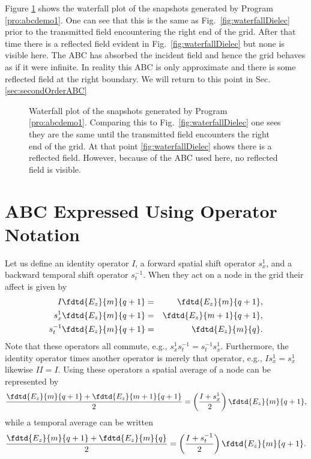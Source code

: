 Figure \ref{fig:dielectricABC} shows the waterfall plot of the
snapshots generated by Program \ref{pro:abcdemo1}.  One can see that
this is the same as Fig.\ \ref{fig:waterfallDielec} prior to the
transmitted field encountering the right end of the grid.  After that
time there is a reflected field evident in Fig.\
\ref{fig:waterfallDielec} but none is visible here.  The ABC has
absorbed the incident field and hence the grid behaves as if it were
infinite.  In reality this ABC is only approximate and there is some
reflected field at the right boundary.  We will return to this point
in Sec. \ref{sec:secondOrderABC}

\begin{figure}
  \begin{center}
  \end{center}
  \caption{Waterfall plot of the snapshots generated by Program
  \ref{pro:abcdemo1}.  Comparing this to Fig.\
  \ref{fig:waterfallDielec} one sees they are the same until the transmitted
  field encounters the right end of the grid.  At that point
  \ref{fig:waterfallDielec} shows there is a reflected field.  However,
  because of the ABC used here, no reflected field is visible.}
  \label{fig:dielectricABC}
\end{figure}

\section{ABC Expressed Using Operator Notation \label{sec:abcOperator}}

Let us define an identity operator $I$, a forward spatial shift
operator $s_x^{1}$, and a backward temporal shift operator $s_t^{-1}$.
When they act on a node in the grid their affect is given by
\begin{eqnarray}
  I\fdtd{E_z}{m}{q+1} &=& \fdtd{E_z}{m}{q+1}, \\
  s_x^{1}\fdtd{E_z}{m}{q+1} &=& \fdtd{E_z}{m+1}{q+1}, \\
  s_t^{-1}\fdtd{E_z}{m}{q+1} &=& \fdtd{E_z}{m}{q}.
\end{eqnarray}
Note that these operators all commute, e.g., $s_x^{1}s_t^{-1} =
s_t^{-1}s_x^{1}$.  Furthermore, the identity operator times another
operator is merely that operator, e.g., $Is_x^{1} = s_x^{1}$ likewise
$II = I$.  Using these operators a spatial average of a node can be
represented by
\begin{equation}
  \frac{\fdtd{E_z}{m}{q+1} + \fdtd{E_z}{m+1}{q+1}}{2} =
  \left(\frac{I+s_x^{1}}{2}\right)\fdtd{E_z}{m}{q+1},
\end{equation}
while a temporal average can be written
\begin{equation}
  \frac{\fdtd{E_z}{m}{q+1} + \fdtd{E_z}{m}{q}}{2} =
  \left(\frac{I+s_t^{-1}}{2}\right)\fdtd{E_z}{m}{q+1}.
\end{equation}

